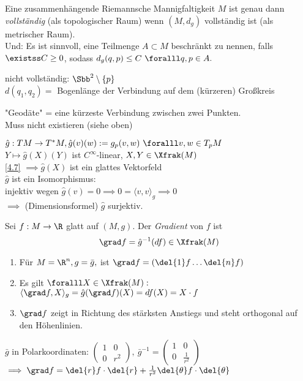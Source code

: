 \begin{cor*}
	Eine zusammenhängende Riemannsche Mannigfaltigkeit $M$ ist genau dann \emph{vollständig} (als topologischer Raum) wenn $(M,d_g)$ vollständig ist (als metrischer Raum).\\
	Und: Es ist sinnvoll, eine Teilmenge $ A \subset M $ beschränkt zu nennen, falls $ \existss C \geq 0 $, sodass $ d_g(q,p) \leq C \ \foralll q,p \in A. $
\end{cor*}

\begin{exmp*}
	nicht vollständig: $ \Sbb^2 \setminus \{p\} $\\
	$ d(q_1,q_2) = $ Bogenlänge der Verbindung auf dem (kürzeren) Großkreis
\end{exmp*}

\begin{rem*}
	"Geodäte" =  eine kürzeste Verbindung zwischen zwei Punkten.\\
	Muss nicht existieren (siehe oben)
\end{rem*}

\begin{rem}
	$ \hat{g}: TM \to T^*M, \hat{g}(v)(w) := g_p(v,w) \ \foralll v,w \in T_pM $\\
	$ Y \mapsto \hat{g}(X)(Y) $ ist $C^\infty$-linear, $X,Y \in \Xfrak(M)$\\
	\ref{4.7} $\implies \hat{g}(X)$ ist ein glattes Vektorfeld \checkmark \\
	$\hat{g}$ ist ein Isomorphismus:\\
	injektiv wegen $\hat{g}(v) = 0 \implies 0 = \langle v,v\rangle_g \implies 0$\\
	$\implies$ (Dimensionsformel) $\hat{g}$ surjektiv.
\end{rem}

\begin{defn*}[Gradient]
	Sei $f: M \to \R$ glatt auf $(M,g)$. Der \emph{Gradient} von $f$ ist
	\[ \grad f = \hat{g}^{-1}(df) \in \Xfrak(M) \]
\end{defn*}

\begin{rem*}
	\begin{enumerate}[label={\roman*})]
		\item Für $ M = \R^n, g = \bar{g}, $ ist $ \grad f = (\del{1}f \dots \del{n}f) $
		\item Es gilt $ \foralll X \in \Xfrak(M): $\\
			$ \langle \grad f, X \rangle_g = \hat{g} (\grad f)(X) = df(X) = X \cdot f $
		\item $\grad f$ zeigt in Richtung des stärksten Anstiegs und steht orthogonal auf den Höhenlinien.
	\end{enumerate}
\end{rem*}

\begin{exmp*}
	$\bar{g}$ in Polarkoordinaten: $ \begin{pmatrix}
		1&0\\0&r^2
	\end{pmatrix},\ \bar{g}^{-1} = \begin{pmatrix}
	1&0\\0&\frac{1}{r^2}
	\end{pmatrix} $\\
	$ \implies \grad f  = \del{r}f \cdot \del{r} + \frac{1}{r^2} \del{\theta}f \cdot \del{\theta} $
\end{exmp*}